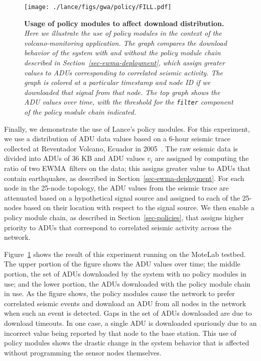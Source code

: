 \begin{figure}[t]
\begin{center}
\texttt{[image: ./lance/figs/gwa/policy/FILL.pdf]}
\end{center}
\caption{\small {\bf Usage of policy modules to affect download
distribution.} 
{\em Here we illustrate the use of policy modules in the context of
the volcano-monitoring application. The graph compares the download behavior
of the system with and without the policy module chain described in
Section~\ref{sec-ewma-deployment}, which assign greater values to ADUs
corresponding to correlated seismic activity. The graph is colored
at a particular timestamp and node ID if we downloaded that signal from that
node. The top graph shows the ADU values over time, with the threshold for
the \texttt{filter} component of the policy module chain indicated.}}
\label{sec-eval-figpolicyfill}
\end{figure}

Finally, we demonstrate the use of Lance's policy modules.  For this
experiment, we use a distribution of ADU data values based on a 6-hour
seismic trace collected at Reventador Volcano, Ecuador in
2005~\cite{volcano-osdi06}. The raw seismic data is divided into ADUs of 36
KB and ADU values $v_i$ are assigned by computing the ratio of two
EWMA~filters on the data; this assigns greater value to ADUs that contain
earthquakes, as described in Section~\ref{sec-ewma-deployment}. For each node
in the 25-node topology, the ADU values from the seismic trace are attenuated
based on a hypothetical signal source and assigned to each of the 25-nodes
based on their location with respect to the signal source. We then enable a
policy module chain, as described in Section~\ref{sec-policies}, that assigns
higher priority to ADUs that correspond to correlated seismic activity across
the network.

Figure~\ref{sec-eval-figpolicyfill} shows the result of this
experiment running on the MoteLab testbed. The upper portion of the
figure shows the ADU values over time; the middle portion, the set of ADUs
downloaded by the system with no policy modules in use; and the lower
portion, the ADUs downloaded with the policy module chain in use.
As the figure shows, the policy modules cause the network to prefer 
correlated seismic events and download an ADU from all nodes in
the network when such an event is detected. Gaps in the set of ADUs
downloaded are due to download timeouts. In one case, a single ADU 
is downloaded spuriously due to an incorrect value being reported by
that node to the base station. This use of policy modules shows the
drastic change in the system behavior that is affected without
programming the sensor nodes themselves.

